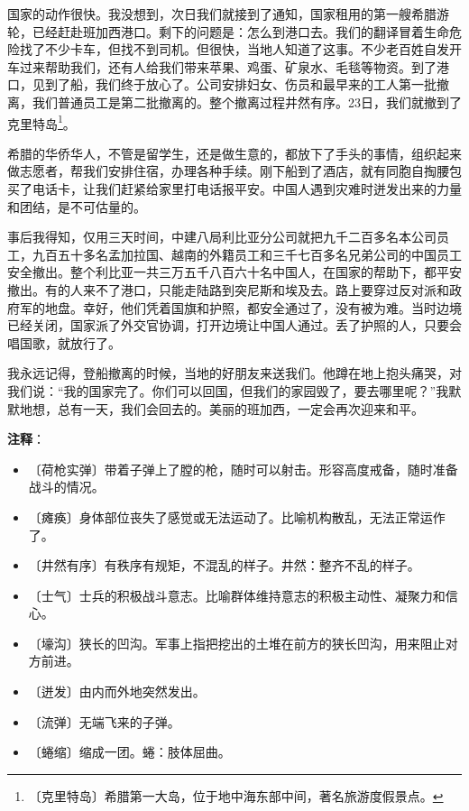 \documentclass[12pt,UTF-8,openany]{ctexbook}
\begin{document}
\begin{large}
    国家的动作很快。我没想到，次日我们就接到了通知，国家租用的第一艘希腊游轮，已经赶赴班加西港口。剩下的问题是：怎么到港口去。我们的翻译冒着生命危险找了不少卡车，但找不到司机。但很快，当地人知道了这事。不少老百姓自发开车过来帮助我们，还有人给我们带来苹果、鸡蛋、矿泉水、毛毯等物资。到了港口，见到了船，我们终于放心了。公司安排妇女、伤员和最早来的工人第一批撤离，我们普通员工是第二批撤离的。整个撤离过程井然有序。23日，我们就撤到了克里特岛\footnote{〔克里特岛〕希腊第一大岛，位于地中海东部中间，著名旅游度假景点。}。
    
    希腊的华侨华人，不管是留学生，还是做生意的，都放下了手头的事情，组织起来做志愿者，帮我们安排住宿，办理各种手续。刚下船到了酒店，就有同胞自掏腰包买了电话卡，让我们赶紧给家里打电话报平安。中国人遇到灾难时迸发出来的力量和团结，是不可估量的。
    
    事后我得知，仅用三天时间，中建八局利比亚分公司就把九千二百多名本公司员工，九百五十多名孟加拉国、越南的外籍员工和三千七百多名兄弟公司的中国员工安全撤出。整个利比亚一共三万五千八百六十名中国人，在国家的帮助下，都平安撤出。有的人来不了港口，只能走陆路到突尼斯和埃及去。路上要穿过反对派和政府军的地盘。幸好，他们凭着国旗和护照，都安全通过了，没有被为难。当时边境已经关闭，国家派了外交官协调，打开边境让中国人通过。丢了护照的人，只要会唱国歌，就放行了。
    
    我永远记得，登船撤离的时候，当地的好朋友来送我们。他蹲在地上抱头痛哭，对我们说：“我的国家完了。你们可以回国，但我们的家园毁了，要去哪里呢？”我默默地想，总有一天，我们会回去的。美丽的班加西，一定会再次迎来和平。
    
\end{large}


\newpage

\textbf{注释}：

\vspace{-1em}

\begin{itemize}
    \setlength\itemsep{-0.2em}
    \item 〔荷枪实弹〕带着子弹上了膛的枪，随时可以射击。形容高度戒备，随时准备战斗的情况。
    \item 〔瘫痪〕身体部位丧失了感觉或无法运动了。比喻机构散乱，无法正常运作了。
    \item 〔井然有序〕有秩序有规矩，不混乱的样子。井然：整齐不乱的样子。
    \item 〔士气〕士兵的积极战斗意志。比喻群体维持意志的积极主动性、凝聚力和信心。
    \item 〔壕沟〕狭长的凹沟。军事上指把挖出的土堆在前方的狭长凹沟，用来阻止对方前进。
    \item 〔迸发〕由内而外地突然发出。
    \item 〔流弹〕无端飞来的子弹。
    \item 〔蜷缩〕缩成一团。蜷：肢体屈曲。
\end{itemize}
\end{document}
